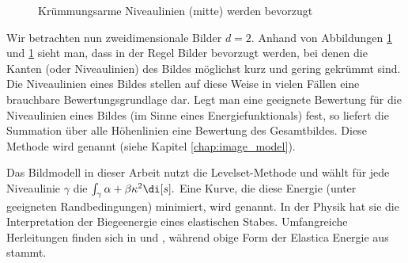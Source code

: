 \documentclass{mythesis}
\begin{document}
\begin{figure}[ht]
    \begin{subfigure}[b]{0.33\textwidth}
	\centering
    \end{subfigure}%
    \begin{subfigure}[b]{0.33\textwidth}
	\centering
    \end{subfigure}%
    \begin{subfigure}[b]{0.33\textwidth}
	\centering
    \end{subfigure}
    \caption{Krümmungsarme Niveaulinien (mitte) werden bevorzugt}
    \label{fig:inpainting_prefer_non_curved}
\end{figure}

Wir betrachten nun zweidimensionale Bilder $d = 2$.
Anhand von Abbildungen \ref{fig:inpainting_prefer_non_curved} und \ref{fig:inpainting_prefer_non_curved} sieht man, dass in der Regel Bilder bevorzugt werden, bei denen die Kanten (oder Niveaulinien) des Bildes möglichst kurz und gering gekrümmt sind.
Die Niveaulinien eines Bildes stellen auf diese Weise in vielen Fällen eine brauchbare Bewertungsgrundlage dar.
Legt man eine geeignete Bewertung für die Niveaulinien eines Bildes (im Sinne eines Energiefunktionals) fest, so liefert die Summation über alle Höhenlinien eine Bewertung des Gesamtbildes.
Diese Methode wird  genannt (siehe Kapitel \ref{chap:image_model}).

Das Bildmodell in dieser Arbeit nutzt die Levelset-Methode und wählt für jede Niveaulinie $\gamma$ die 
\begin{math}
    \int_{\gamma} \alpha + \beta \kappa^2 \di[s].
\end{math}
Eine Kurve, die diese Energie (unter geeigneten Randbedingungen) minimiert, wird  genannt.
In der Physik hat sie die Interpretation der Biegeenergie eines elastischen Stabes.
Umfangreiche Herleitungen finden sich in \cite{love1920treatise} und \cite{antman2005problems}, während obige Form der Elastica Energie aus \cite{birkhoff1965nonlinear} stammt.
\end{document}
